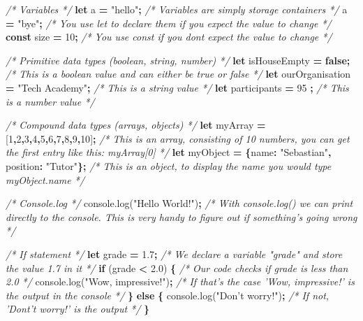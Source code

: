 \documentclass[
]{article}
\newenvironment{Shaded}{\begin{snugshade}}{\end{snugshade}}
\newcommand{\AttributeTok}[1]{\textcolor[rgb]{0.77,0.63,0.00}{#1}}
\newcommand{\CommentTok}[1]{\textcolor[rgb]{0.56,0.35,0.01}{\textit{#1}}}
\newcommand{\ControlFlowTok}[1]{\textcolor[rgb]{0.13,0.29,0.53}{\textbf{#1}}}
\newcommand{\DataTypeTok}[1]{\textcolor[rgb]{0.13,0.29,0.53}{#1}}
\newcommand{\DecValTok}[1]{\textcolor[rgb]{0.00,0.00,0.81}{#1}}
\newcommand{\FloatTok}[1]{\textcolor[rgb]{0.00,0.00,0.81}{#1}}
\newcommand{\KeywordTok}[1]{\textcolor[rgb]{0.13,0.29,0.53}{\textbf{#1}}}
\newcommand{\NormalTok}[1]{#1}
\newcommand{\OperatorTok}[1]{\textcolor[rgb]{0.81,0.36,0.00}{\textbf{#1}}}
\newcommand{\StringTok}[1]{\textcolor[rgb]{0.31,0.60,0.02}{#1}}
\newcommand{\VariableTok}[1]{\textcolor[rgb]{0.00,0.00,0.00}{#1}}
\begin{document}
\begin{Shaded}
\begin{Highlighting}[]
\CommentTok{/* Variables */}
\KeywordTok{let}\NormalTok{ a }\OperatorTok{=} \StringTok{"hello"}\OperatorTok{;} \CommentTok{/* Variables are simply storage containers */}
\NormalTok{a }\OperatorTok{=} \StringTok{"bye"}\OperatorTok{;}       \CommentTok{/* You use let to declare them if you expect the value to change */}
\KeywordTok{const}\NormalTok{ size }\OperatorTok{=} \DecValTok{10}\OperatorTok{;} \CommentTok{/* You use const if you dont expect the value to change */}

\CommentTok{/* Primitive data types (boolean, string, number) */}
\KeywordTok{let}\NormalTok{ isHouseEmpty }\OperatorTok{=} \KeywordTok{false}\OperatorTok{;}             \CommentTok{/* This is a boolean value and can either be true or false */}
\KeywordTok{let}\NormalTok{ ourOrganisation }\OperatorTok{=} \StringTok{"Tech Academy"}\OperatorTok{;} \CommentTok{/* This is a string value */}
\KeywordTok{let}\NormalTok{ participants }\OperatorTok{=} \DecValTok{95}  \OperatorTok{;}              \CommentTok{/* This is a number value */}

\CommentTok{/* Compound data types (arrays, objects) */}
\KeywordTok{let}\NormalTok{ myArray }\OperatorTok{=}\NormalTok{ [}\DecValTok{1}\OperatorTok{,}\DecValTok{2}\OperatorTok{,}\DecValTok{3}\OperatorTok{,}\DecValTok{4}\OperatorTok{,}\DecValTok{5}\OperatorTok{,}\DecValTok{6}\OperatorTok{,}\DecValTok{7}\OperatorTok{,}\DecValTok{8}\OperatorTok{,}\DecValTok{9}\OperatorTok{,}\DecValTok{10}\NormalTok{]}\OperatorTok{;}                  \CommentTok{/* This is an array, consisting of 10 numbers, you can get the first entry like this: myArray[0] */}
\KeywordTok{let}\NormalTok{ myObject }\OperatorTok{=} \OperatorTok{\{}\DataTypeTok{name}\OperatorTok{:} \StringTok{"Sebastian"}\OperatorTok{,} \DataTypeTok{position}\OperatorTok{:} \StringTok{"Tutor"}\OperatorTok{\};} \CommentTok{/* This is an object, to display the name you would type myObject.name */}

\CommentTok{/* Console.log */}
\VariableTok{console}\NormalTok{.}\AttributeTok{log}\NormalTok{(}\StringTok{"Hello World!"}\NormalTok{)}\OperatorTok{;} \CommentTok{/* With console.log() we can print directly to the console. This is very handy to figure out if something's going wrong */}

\CommentTok{/* If statement */}
\KeywordTok{let}\NormalTok{ grade }\OperatorTok{=} \FloatTok{1.7}\OperatorTok{;} \CommentTok{/* We declare a variable "grade" and store the value 1.7 in it */}
\ControlFlowTok{if}\NormalTok{ (grade }\OperatorTok{<} \FloatTok{2.0}\NormalTok{) }\OperatorTok{\{} \CommentTok{/* Our code checks if grade is less than 2.0 */}
  \VariableTok{console}\NormalTok{.}\AttributeTok{log}\NormalTok{(}\StringTok{"Wow, impressive!"}\NormalTok{)}\OperatorTok{;} \CommentTok{/* If that's the case 'Wow, impressive!' is the output in the console */}
\OperatorTok{\}}
\ControlFlowTok{else} \OperatorTok{\{}
  \VariableTok{console}\NormalTok{.}\AttributeTok{log}\NormalTok{(}\StringTok{"Don't worry!"}\NormalTok{)}\OperatorTok{;} \CommentTok{/* If not, 'Dont't worry!' is the output */}
\OperatorTok{\}}


\end{Highlighting}
\end{Shaded}
\end{document}
